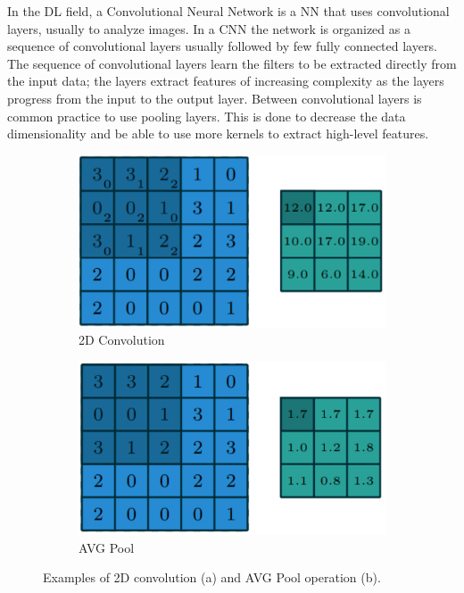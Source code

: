 \documentclass[../main.tex]{subfiles}
\begin{document}
In the DL field, a Convolutional Neural Network is a NN that uses convolutional layers, usually to analyze images.
In a CNN the network is organized as a sequence of convolutional layers usually followed by few fully connected layers.
The sequence of convolutional layers learn the filters to be extracted directly from the input data; the layers extract features of increasing complexity as the layers progress from the input to the output layer.
Between convolutional layers is common practice to use pooling layers. This is done to decrease the data dimensionality and be able to use more kernels to extract high-level features.

\begin{figure}[h!]
    \centering
    \begin{subfigure}[]{0.4\linewidth}
        \label{fig:conv}
        \includegraphics[width=\linewidth]{images/Convolution.png}
        \caption{2D Convolution}
    \end{subfigure}
    \hspace{1cm}
    \begin{subfigure}[]{0.4\linewidth}
        \label{fig:avgPool}
        \includegraphics[width=\linewidth]{images/AVGPool.png}
        \caption{AVG Pool}
    \end{subfigure}
    \caption{Examples of 2D convolution (a) and AVG Pool operation (b). ~\cite{dumoulin2016guide}}
    \label{fig:ConvImgs}
\end{figure}
\end{document}

